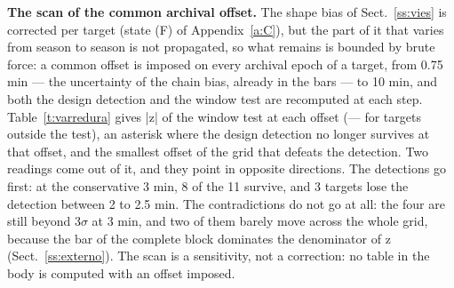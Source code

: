 \documentclass{aa}
\begin{document}
\textbf{The scan of the common archival offset.} The shape bias of Sect.~\ref{ss:vies} is corrected per target (state (F) of Appendix~\ref{a:C}), but the part of it that varies from season to season is not propagated, so what remains is bounded by brute force: a common offset is imposed on every archival epoch of a target, from 0.75 min --- the uncertainty of the chain bias, already in the bars --- to 10 min, and both the design detection and the window test are recomputed at each step. Table~\ref{t:varredura} gives |z| of the window test at each offset (--- for targets outside the test), an asterisk where the design detection no longer survives at that offset, and the smallest offset of the grid that defeats the detection. Two readings come out of it, and they point in opposite directions. The detections go first: at the conservative 3 min, 8 of the 11 survive, and 3 targets lose the detection between 2 to 2.5 min. The contradictions do not go at all: the four are still beyond 3$\sigma$ at 3 min, and two of them barely move across the whole grid, because the bar of the complete block dominates the denominator of z (Sect.~\ref{ss:externo}). The scan is a sensitivity, not a correction: no table in the body is computed with an offset imposed.
\end{document}
